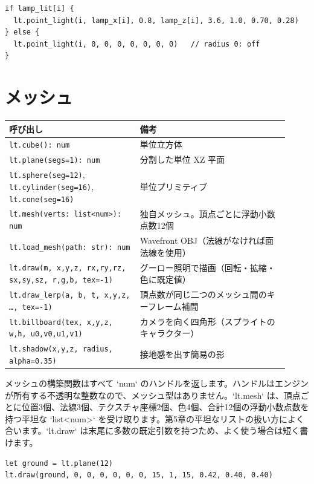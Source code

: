 \begin{lstlisting}[language=wick]
if lamp_lit[i] {
  lt.point_light(i, lamp_x[i], 0.8, lamp_z[i], 3.6, 1.0, 0.70, 0.28)
} else {
  lt.point_light(i, 0, 0, 0, 0, 0, 0, 0)   // radius 0: off
}
\end{lstlisting}

\section{メッシュ}

\begin{center}
\small\begin{tabular}{@{}p{0.43\linewidth}p{0.49\linewidth}@{}}
\toprule
\textbf{呼び出し} & \textbf{備考} \\
\midrule
\texttt{lt.cube(): num} & 単位立方体 \\
\texttt{lt.plane(segs=1): num} & 分割した単位 XZ 平面 \\
\texttt{lt.sphere(seg=12)}, \texttt{lt.cylinder(seg=16)}, \texttt{lt.cone(seg=16)} & 単位プリミティブ \\
\texttt{lt.mesh(verts: list<num>): num} & 独自メッシュ。頂点ごとに浮動小数点数12個 \\
\texttt{lt.load\_mesh(path: str): num} & Wavefront OBJ（法線がなければ面法線を使用） \\
\texttt{lt.draw(m, x,y,z, rx,ry,rz, sx,sy,sz, r,g,b, tex=-1)} & グーロー照明で描画（回転・拡縮・色に既定値） \\
\texttt{lt.draw\_lerp(a, b, t, x,y,z, \ldots, tex=-1)} & 頂点数が同じ二つのメッシュ間のキーフレーム補間 \\
\texttt{lt.billboard(tex, x,y,z, w,h, u0,v0,u1,v1)} & カメラを向く四角形（スプライトのキャラクター） \\
\texttt{lt.shadow(x,y,z, radius, alpha=0.35)} & 接地感を出す簡易の影 \\
\bottomrule
\end{tabular}
\end{center}

\noindent
メッシュの構築関数はすべて `num` のハンドルを返します。ハンドルはエンジンが所有する不透明な整数なので、メッシュ型はありません。`lt.mesh` は、頂点ごとに位置3個、法線3個、テクスチャ座標2個、色4個、合計12個の浮動小数点数を持つ平坦な `list<num>` を受け取ります。第5章の平坦なリストの扱い方によく合います。`lt.draw` は末尾に多数の既定引数を持つため、よく使う場合は短く書けます。

\begin{lstlisting}[language=wick]
let ground = lt.plane(12)
lt.draw(ground, 0, 0, 0, 0, 0, 0, 15, 1, 15, 0.42, 0.40, 0.40)
\end{lstlisting}

